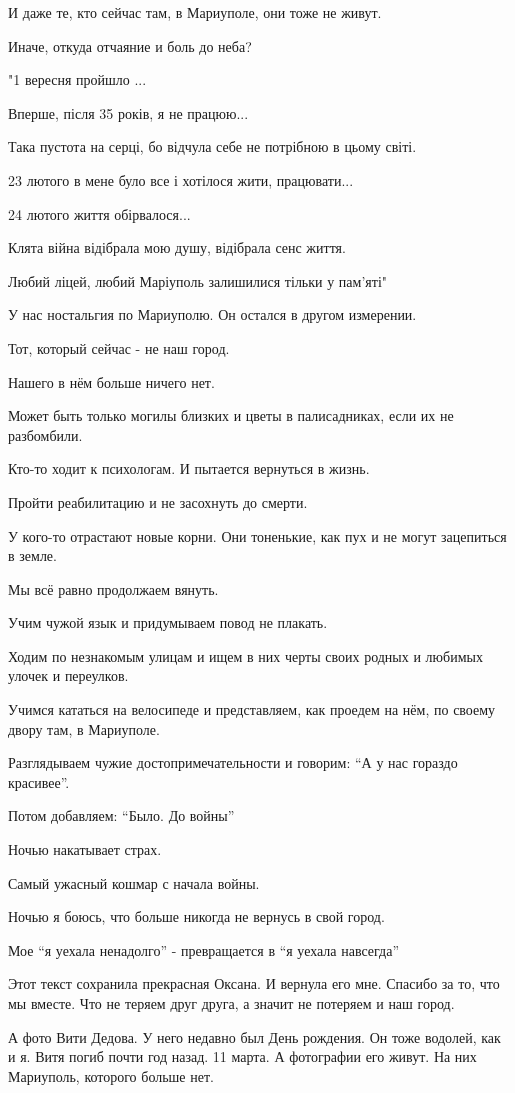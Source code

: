 И даже те, кто сейчас там,  в Мариуполе, они тоже не живут. 

Иначе, откуда  отчаяние и боль до неба? 

"1 вересня пройшло ... 

Вперше, після 35 років, я не працюю... 

Така пустота на серці, бо відчула себе не потрібною в цьому світі. 

23 лютого в мене було все і хотілося жити, працювати...

24 лютого життя обірвалося... 

Клята війна відібрала мою душу, відібрала сенс життя. 

Любий ліцей, любий Маріуполь залишилися тільки у пам'яті"

У нас ностальгия по Мариуполю. Он   остался в другом измерении.  

Тот,  который сейчас - не наш город. 

Нашего в нём больше ничего нет.

Может быть только могилы близких и цветы в палисадниках, если их не разбомбили. 

Кто-то ходит к психологам. И пытается вернуться в жизнь.

Пройти реабилитацию и не засохнуть до смерти. 

У кого-то отрастают новые корни. Они тоненькие, как пух и не могут зацепиться в
земле. 

Мы всё равно  продолжаем вянуть. 

Учим чужой язык и придумываем повод не плакать. 

Ходим по незнакомым  улицам и ищем в них черты своих родных и любимых улочек и
переулков. 

Учимся кататься на велосипеде и представляем, как проедем на нём,  по своему
двору там, в Мариуполе. 

Разглядываем чужие достопримечательности и говорим: \enquote{А у нас гораздо красивее}. 

Потом добавляем: \enquote{Было. До войны}

Ночью накатывает страх. 

Самый ужасный кошмар с начала войны. 

Ночью я боюсь, что больше никогда не вернусь в свой город. 

Мое \enquote{я уехала ненадолго} -  превращается в \enquote{я уехала навсегда}

Этот текст сохранила прекрасная Оксана. И вернула его мне. Спасибо за то, что
мы вместе. Что не теряем друг друга, а значит не потеряем и наш  город. 

А фото Вити  Дедова. У него недавно был День рождения. Он тоже водолей, как и
я. Витя погиб почти год назад. 11 марта.  А фотографии его живут. На них
Мариуполь, которого больше нет.
